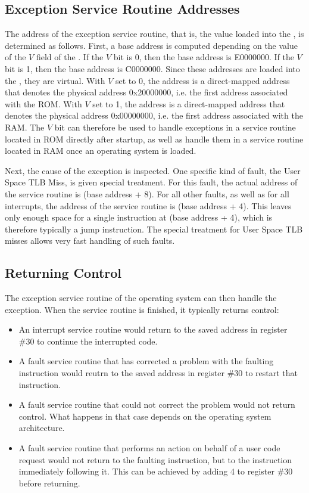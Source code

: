 \subsection{Exception Service Routine Addresses}

The address of the exception service routine, that is, the value loaded into the \pcx, is determined as follows. First, a base address is computed depending on the value of the $V$ field of the \pswx. If the $V$ bit is 0, then the base address is E0000000. If the $V$ bit is 1, then the base address is C0000000. Since these addresses are loaded into the \pcx, they are virtual. With $V$ set to 0, the address is a direct-mapped address that denotes the physical address 0x20000000, i.e. the first address associated with the ROM. With $V$ set to 1, the address is a direct-mapped address that denotes the physical address 0x00000000, i.e. the first address associated with the RAM. The $V$ bit can therefore be used to handle exceptions in a service routine located in ROM directly after startup, as well as handle them in a service routine located in RAM once an operating system is loaded.

Next, the cause of the exception is inspected. One specific kind of fault, the User Space TLB Miss, is given special treatment. For this fault, the actual address of the service routine is (base address + 8). For all other faults, as well as for all interrupts, the address of the service routine is (base address + 4). This leaves only enough space for a single instruction at (base address + 4), which is therefore typically a jump instruction. The special treatment for User Space TLB misses allows very fast handling of such faults. 

\subsection{Returning Control}

The exception service routine of the operating system can then handle the exception. When the service routine is finished, it typically returns control:
\begin{itemize}
\item An interrupt service routine would return to the saved address in register \#30 to continue the interrupted code.
\item A fault service routine that has corrected a problem with the faulting instruction would reutrn to the saved address in register \#30 to restart that instruction.
\item A fault service routine that could not correct the problem would not return control. What happens in that case depends on the operating system architecture.
\item A fault service routine that performs an action on behalf of a user code request would not return to the faulting instruction, but to the instruction immediately following it. This can be achieved by adding 4 to register \#30 before returning.
\end{itemize}

